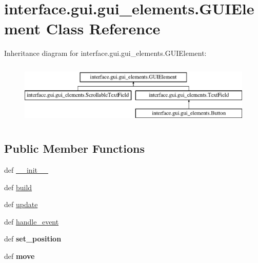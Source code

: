 \hypertarget{classinterface_1_1gui_1_1gui__elements_1_1_g_u_i_element}{\section{interface.\-gui.\-gui\-\_\-elements.\-G\-U\-I\-Element \-Class \-Reference}
\label{classinterface_1_1gui_1_1gui__elements_1_1_g_u_i_element}
}
\-Inheritance diagram for interface.\-gui.\-gui\-\_\-elements.\-G\-U\-I\-Element\-:\begin{figure}[H]
\begin{center}
\leavevmode
\includegraphics[height=3.000000cm]{classinterface_1_1gui_1_1gui__elements_1_1_g_u_i_element}
\end{center}
\end{figure}
\subsection*{\-Public \-Member \-Functions}
\begin{DoxyCompactItemize}
\item 
def \hyperlink{classinterface_1_1gui_1_1gui__elements_1_1_g_u_i_element_a3862df363cddeb362015c9d5b9dd1de5}{\-\_\-\-\_\-init\-\_\-\-\_\-}
\item 
def \hyperlink{classinterface_1_1gui_1_1gui__elements_1_1_g_u_i_element_af8f2f95644018b351db2ddb72cd458d4}{build}
\item 
def \hyperlink{classinterface_1_1gui_1_1gui__elements_1_1_g_u_i_element_a5c15d6dbe19319892174944767ec09d8}{update}
\item 
def \hyperlink{classinterface_1_1gui_1_1gui__elements_1_1_g_u_i_element_abd0d1220fd7cd0afdbfa415224a8a0af}{handle\-\_\-event}
\item 
\hypertarget{classinterface_1_1gui_1_1gui__elements_1_1_g_u_i_element_a47fce23513b34fd6578f60b04bf6835e}{def {\bfseries set\-\_\-position}}\label{classinterface_1_1gui_1_1gui__elements_1_1_g_u_i_element_a47fce23513b34fd6578f60b04bf6835e}

\item 
\hypertarget{classinterface_1_1gui_1_1gui__elements_1_1_g_u_i_element_a11df9f87735b9268fa4ea8c316339dce}{def {\bfseries move}}\label{classinterface_1_1gui_1_1gui__elements_1_1_g_u_i_element_a11df9f87735b9268fa4ea8c316339dce}

\end{DoxyCompactItemize}
